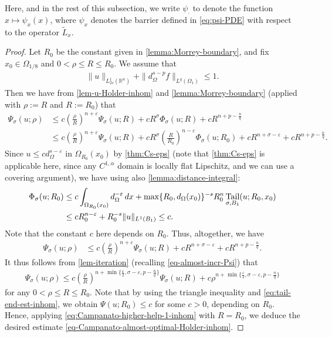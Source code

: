 \documentclass[11pt,reqno]{amsart}
\theoremstyle{plain}
\theoremstyle{definition}
\numberwithin{equation}{section}
\newcommand{\R}{\mathbb{R}}
\newcommand{\eps}{\varepsilon}
\newcommand{\1}{\mathbbm{1}}
\DeclareMathOperator{\tail}{Tail}
\renewcommand{\d}{\textnormal{\,d}}
\begin{document}
Here, and in the rest of this subsection, we write $\psi_{\cdot}$ to denote the function $x \mapsto \psi_x(x)$, where $\psi_x$ denotes the barrier defined in \eqref{eq:psi-PDE} with respect to the operator $\widetilde{L}_x$.

\begin{proof}
Let $R_0$ be the constant given in \autoref{lemma:Morrey-boundary}, and fix $x_0 \in \Omega_{1/8}$ and $0<\rho\leq R\leq R_0$. We assume that 
\begin{align*}
\|u\|_{L^1_{2s}(\R^n)} + \|d^{s-p}_{\Omega} f\|_{L^q(\Omega_1)} \le 1.
\end{align*}
Then we have from \autoref{lem-u-Holder-inhom} and \autoref{lemma:Morrey-boundary} (applied with $\rho := R$ and $R := R_0$) that
\begin{align*}
\Psi_{\sigma}(u; \rho)
&\leq c \left( \frac{\rho}{R} \right)^{n+\varepsilon} \Psi_{\sigma}(u; R) + cR^\sigma \Phi_{\sigma}(u; R) + c R^{n + p-\frac{n}{q}} \\
&\leq c \left( \frac{\rho}{R} \right)^{n+\varepsilon} \Psi_{\sigma}(u; R) + cR^\sigma \left( \frac{R}{R_0} \right)^{n-\varepsilon} \Phi_{\sigma}(u; R_0) + cR^{n+\sigma-\varepsilon} + c R^{n + p-\frac{n}{q}}.
\end{align*}
Since $u \le c d_{\Omega}^{s-\eps}$ in $\Omega_{R_0}(x_0)$ by \autoref{thm:Cs-eps} (note that \autoref{thm:Cs-eps} is applicable here, since any $C^{1,\alpha}$ domain is locally flat Lipschitz, and we can use a covering argument), we have using also \autoref{lemma:distance-integral}:
\begin{align}
\label{eq:tail-end-est-inhom}
\begin{split}
    \Phi_{\sigma}(u; R_0)
    &\leq c \int_{\Omega_{R_0}(x_0)} d_\Omega^{-\varepsilon} \d x + \max\{R_0, d_\Omega(x_0)\}^{-s} R_0^n \tail_{\sigma, B_1}(u; R_0, x_0) \\
    &\leq cR_0^{n-\varepsilon} + R_0^{-s} \|u\|_{L^1(B_1)} \leq c.
\end{split}
\end{align}
Note that the constant $c$ here depends on $R_0$. Thus, altogether, we have
\begin{align*}
\Psi_\sigma(u;\rho) &\leq c \left( \frac{\rho}{R} \right)^{n+\varepsilon} \Psi_\sigma(u;R) + c R^{n + \sigma -\eps} + c R^{n + p - \frac{n}{q}} .
\end{align*}
It thus follows from \autoref{lem-iteration} (recalling \eqref{eq-almost-incr-Psi}) that
\begin{align}
\label{eq:Campanato-higher-help-1-inhom}
\Psi_\sigma(u; \rho) \leq c \left( \frac{\rho}{R} \right)^{n+\min\{\frac{\varepsilon}{2}, \sigma-\varepsilon,p - \frac{n}{q}\}} \Psi_\sigma(u; R) + c \rho^{n+\min\{\frac{\varepsilon}{2}, \sigma-\varepsilon,p - \frac{n}{q}\}}
\end{align}
for any $0 < \rho \leq R \leq R_0$. Note that by using the triangle inequality and \eqref{eq:tail-end-est-inhom}, we obtain $\Psi(u;R_0) \le c$ for some $c > 0$, depending on $R_0$. Hence, applying \eqref{eq:Campanato-higher-help-1-inhom} with $R = R_0$, we deduce the desired estimate \eqref{eq-Campanato-almost-optimal-Holder-inhom}.



\end{proof}
\end{document}
